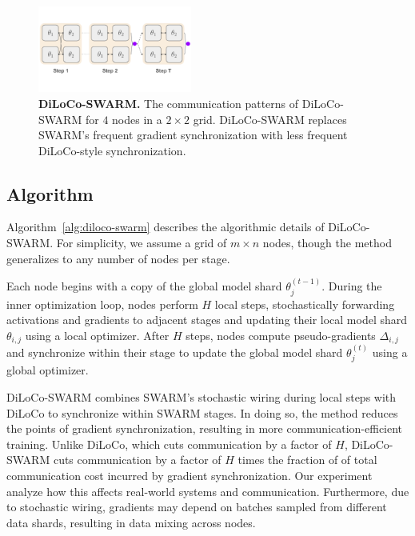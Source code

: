 \documentclass{article}
\begin{document}
\begin{figure}[ht]
    \centering
    \includegraphics[width=0.45\textwidth]{figures/diloco-swarm.pdf}
    \caption{\textbf{DiLoCo-SWARM.} The communication patterns of DiLoCo-SWARM for $4$ nodes in a $2\times 2$ grid. DiLoCo-SWARM replaces SWARM's frequent gradient synchronization with less frequent DiLoCo-style synchronization.}
    \label{fig:diloco-swarm}
\end{figure}

\subsection{Algorithm}

Algorithm~\ref{alg:diloco-swarm} describes the algorithmic details of DiLoCo-SWARM. For simplicity, we assume a grid of $m \times n$ nodes, though the method generalizes to any number of nodes per stage. 

Each node begins with a copy of the global model shard $\theta_j^{(t-1)}$. During the inner optimization loop, nodes perform $H$ local steps, stochastically forwarding activations and gradients to adjacent stages and updating their local model shard $\theta_{i,j}$ using a local optimizer. After $H$ steps, nodes compute pseudo-gradients $\Delta_{i,j}$ and synchronize within their stage to update the global model shard $\theta_j^{(t)}$ using a global optimizer.

DiLoCo-SWARM combines SWARM's stochastic wiring during local steps with DiLoCo to synchronize within SWARM stages. In doing so, the method reduces the points
of gradient synchronization, resulting in more communication-efficient training. Unlike DiLoCo, which cuts communication by a factor of $H$, DiLoCo-SWARM cuts communication by a factor of $H$ times the fraction of of total communication cost incurred by gradient synchronization. Our experiment analyze how this affects real-world systems and communication. Furthermore, due to stochastic wiring, gradients may depend on batches sampled from different data shards, resulting in data mixing across nodes.
\end{document}
